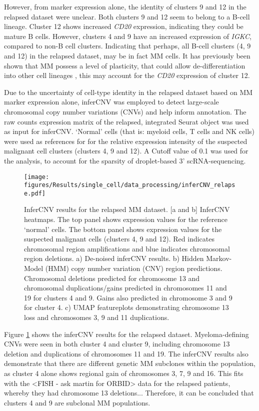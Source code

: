 However, from marker expression alone, the identity of clusters 9 and 12 in the relapsed dataset were unclear.
Both clusters 9 and 12 seem to belong to a B-cell lineage.
Cluster 12 shows increased \textit{CD20} expression, indicating they could be mature B cells.
However, clusters 4 and 9 have an increased expression of \textit{IGKC}, compared to non-B cell clusters.
Indicating that perhaps, all B-cell clusters (4, 9 and 12) in the relapsed dataset, may be in fact MM cells.
It has previously been shown that MM possess a level of plasticity, that could allow de-differentiation into other cell lineages \cite{kotouvcek2014myeloma}, this may account for the \textit{CD20} expression of cluster 12.

Due to the uncertainty of cell-type identity in the relapsed dataset based on MM marker expression alone, inferCNV \cite{patel2014single, infercnv2014} was employed to detect large-scale chromosomal copy number variations (CNVs) and help inform annotation.
The raw counts expression matrix of the relapsed, integrated Seurat object was used as input for inferCNV\@.
`Normal' cells (that is: myeloid cells, T cells and NK cells) were used as references for for the relative expression intensity of the suspected malignant cell clusters (clusters 4, 9 and 12).
A Cutoff value of 0.1 was used for the analysis, to account for the sparsity of droplet-based 3' scRNA-sequencing.
%
\begin{figure}[htb]
    \centering
    \texttt{[image: figures/Results/single\_cell/data\_processing/inferCNV\_relapse.pdf]}
    \caption[inferCNV- relapsed MM]{InferCNV results for the relapsed MM dataset.
    [a and b] InferCNV heatmaps.
        The top panel shows expression values for the reference `normal' cells.
        The bottom panel shows expression values for the suspected malignant cells (clusters 4, 9 and 12).
        Red indicates chromosomal region amplifications and blue indicates chromosomal region deletions.
    a) De-noised inferCNV results.
    b) Hidden Markov-Model (HMM) copy number variation (CNV) region predictions.
        Chromosomal deletions predicted for chromosome 13 and chromosomal duplications/gains predicted in chromosomes 11 and 19 for clusters 4 and 9.
        Gains also predicted in chromosome 3 and 9 for cluster 4.
    c) UMAP featureplots demonstrating chromosome 13 loss and chromosomes 3, 9 and 11 duplications.
    }
    \label{fig:inferCNV_relapse}
\end{figure}
%
Figure \ref{fig:inferCNV_relapse} shows the inferCNV results for the relapsed dataset.
Myeloma-defining CNVs were seen in both cluster 4 and cluster 9, including chromosome 13 deletion and duplications of chromosomes 11 and 19.
The inferCNV results also demonstrate that there are different genetic MM subclones within the population, as cluster 4 alone shows regional gain of chromosomes 3, 7, 9 and 16.
This fits with the <FISH - ask martin for ORBID> data for the relapsed patients, whereby they had chromosome 13 deletions...
Therefore, it can be concluded that clusters 4 and 9 are subclonal MM populations.

